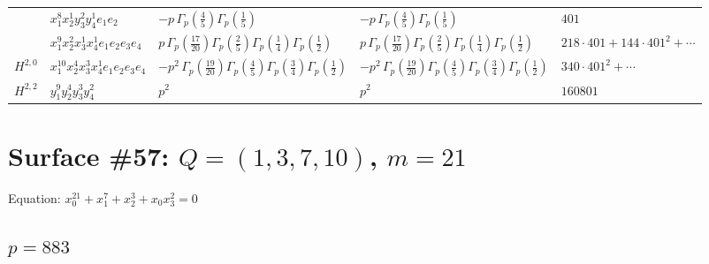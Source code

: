 \documentclass[11pt]{article}
\begin{document}
\begin{table}[ht]
{\begin{tabular}{@{}lllll@{}}
 & $x_{1}^{8} x_{2}^{1} y_{3}^{2} y_{4}^{1} e_{1} e_{2}$ & $- p \, \Gamma_p \left( \frac{4}{5} \right) \Gamma_p \left( \frac{1}{5} \right)$ & $- p \, \Gamma_p \left( \frac{4}{5} \right) \Gamma_p \left( \frac{1}{5} \right)$ & $401$ \\
 & $x_{1}^{9} x_{2}^{2} x_{3}^{1} x_{4}^{1}  e_{1} e_{2} e_{3} e_{4}$ & $p \, \Gamma_p \left( \frac{17}{20} \right) \Gamma_p \left( \frac{2}{5} \right) \Gamma_p \left( \frac{1}{4} \right) \Gamma_p \left( \frac{1}{2} \right)$ & $p \, \Gamma_p \left( \frac{17}{20} \right) \Gamma_p \left( \frac{2}{5} \right) \Gamma_p \left( \frac{1}{4} \right) \Gamma_p \left( \frac{1}{2} \right)$ & $218{\cdot}401{+}144{\cdot}401^{2}{+}\cdots$ \\
\midrule
$H^{2,0}$ & $x_{1}^{10} x_{2}^{4} x_{3}^{3} x_{4}^{1}  e_{1} e_{2} e_{3} e_{4}$ & $- p^{2} \, \Gamma_p \left( \frac{19}{20} \right) \Gamma_p \left( \frac{4}{5} \right) \Gamma_p \left( \frac{3}{4} \right) \Gamma_p \left( \frac{1}{2} \right)$ & $- p^{2} \, \Gamma_p \left( \frac{19}{20} \right) \Gamma_p \left( \frac{4}{5} \right) \Gamma_p \left( \frac{3}{4} \right) \Gamma_p \left( \frac{1}{2} \right)$ & $340{\cdot}401^{2}{+}\cdots$ \\
\midrule
$H^{2,2}$ & $y_{1}^{9} y_{2}^{4} y_{3}^{3} y_{4}^{2}$ & $p^{2} \,$ & $p^{2} \,$ & $160801$ \\
\bottomrule
\end{tabular}
}
\renewcommand{\arraystretch}{1.0}
\end{table}

\newpage

\section*{Surface \#57: $Q=(1, 3, 7, 10)$, $m=21$}

Equation: $x_0^{21} + x_1^{7} + x_2^{3} + x_0 x_3^{2} = 0$

\subsection*{$p = 883$}
\end{document}
